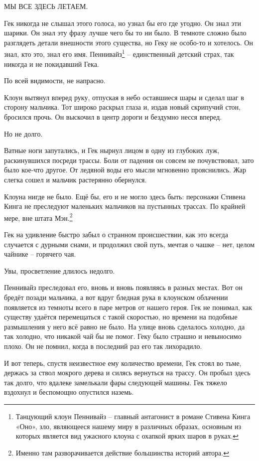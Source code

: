 \documentclass[
  a5paperpaper,
  DIV=11,
  numbers=noendperiod]{scrreprt}
\begin{document}
МЫ ВСЕ ЗДЕСЬ ЛЕТАЕМ.

Гек никогда не слышал этого голоса, но узнал бы его где угодно. Он знал
эти шарики. Он знал эту фразу лучше чего бы то ни было. В темноте сложно
было разглядеть детали внешности этого существа, но Геку не особо-то и
хотелось. Он знал, кто это, знал его имя. Пеннивайз\footnote{Танцующий
  клоун Пеннивайз -- главный антагонист в романе Стивена Кинга «Оно»,
  зло, являющееся нашему миру в различных образах, основным из которых
  является вид ужасного клоуна с охапкой ярких шаров в руках.} --
единственный детский страх, так никогда и не покидавший Гека.

По всей видимости, не напрасно.

Клоун вытянул вперед руку, отпуская в небо оставшиеся шары и сделал шаг
в сторону мальчика. Тот широко раскрыл глаза и, издав новый скрипучий
стон, бросился прочь. Он выскочил в центр дороги и бездумно несся
вперед.

Но не долго.

Ватные ноги запутались, и Гек нырнул лицом в одну из глубоких луж,
раскинувшихся посреди трассы. Боли от падения он совсем не почувствовал,
зато было кое-что другое. От ледяной воды его мысли мгновенно
прояснились. Жар слегка сошел и мальчик растерянно обернулся.

Клоуна нигде не было. Ещё бы, его и не могло здесь быть: персонажи
Стивена Кинга не преследуют маленьких мальчиков на пустынных трассах. По
крайней мере, вне штата Мэн.\footnote{Именно там разворачивается
  действие большинства историй автора.}

Гек на удивление быстро забыл о странном происшествии, как это всегда
случается с дурными снами, и продолжил свой путь, мечтая о чашке -- нет,
целом чайнике -- горячего чая.

Увы, просветление длилось недолго.

Пеннивайз преследовал его, вновь и вновь появляясь в разных местах. Вот
он бредёт позади мальчика, а вот вдруг бледная рука в клоунском
облачении появляется из темноты всего в паре метров от нашего героя. Гек
не понимал, как существу удаётся перемещаться с такой скоростью, но
времени на подобные размышления у него всё равно не было. На улице вновь
сделалось холодно, да так холодно, что никакой чай бы не помог. Геку
было страшно и невыносимо плохо. Он не помнил, когда в последний раз его
так лихорадило.

И вот теперь, спустя неизвестное ему количество времени, Гек стоял во
тьме, держась за ствол мокрого дерева и силясь вернуться на трассу. Он
пробыл здесь так долго, что вдалеке замелькали фары следующей машины.
Гек тяжело вздохнул и беспомощно опустился наземь.
\end{document}
